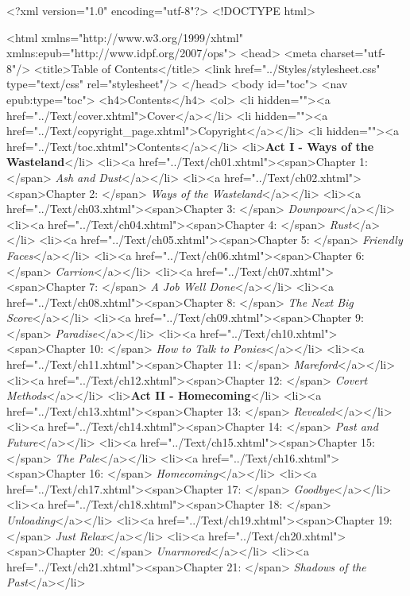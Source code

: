 <?xml version="1.0" encoding="utf-8"?>
<!DOCTYPE html>

<html xmlns="http://www.w3.org/1999/xhtml" xmlns:epub="http://www.idpf.org/2007/ops">
<head>
	<meta charset="utf-8"/>
	<title>Table of Contents</title>
	<link href="../Styles/stylesheet.css" type="text/css" rel="stylesheet"/>
</head>
<body id="toc">
<nav epub:type="toc">
	<h4>Contents</h4>
		<ol>
		<li hidden=""><a href="../Text/cover.xhtml">Cover</a></li>
		<li hidden=""><a href="../Text/copyright\_page.xhtml">Copyright</a></li>
		<li hidden=""><a href="../Text/toc.xhtml">Contents</a></li>
		<li>\textbf{Act I - Ways of the Wasteland}</li>
		<li><a href="../Text/ch01.xhtml"><span>Chapter 1: </span>\textit{ Ash and Dust}</a></li>
		<li><a href="../Text/ch02.xhtml"><span>Chapter 2: </span>\textit{ Ways of the Wasteland}</a></li>
		<li><a href="../Text/ch03.xhtml"><span>Chapter 3: </span>\textit{ Downpour}</a></li>
		<li><a href="../Text/ch04.xhtml"><span>Chapter 4: </span>\textit{ Rust}</a></li>
		<li><a href="../Text/ch05.xhtml"><span>Chapter 5: </span>\textit{ Friendly Faces}</a></li>
		<li><a href="../Text/ch06.xhtml"><span>Chapter 6: </span>\textit{ Carrion}</a></li>
		<li><a href="../Text/ch07.xhtml"><span>Chapter 7: </span>\textit{ A Job Well Done}</a></li>
		<li><a href="../Text/ch08.xhtml"><span>Chapter 8: </span>\textit{ The Next Big Score}</a></li>
		<li><a href="../Text/ch09.xhtml"><span>Chapter 9: </span>\textit{ Paradise}</a></li>
		<li><a href="../Text/ch10.xhtml"><span>Chapter 10: </span>\textit{ How to Talk to Ponies}</a></li>
		<li><a href="../Text/ch11.xhtml"><span>Chapter 11: </span>\textit{ Mareford}</a></li>
		<li><a href="../Text/ch12.xhtml"><span>Chapter 12: </span>\textit{ Covert Methods}</a></li>
				<li>\textbf{Act II - Homecoming}</li>
		<li><a href="../Text/ch13.xhtml"><span>Chapter 13: </span>\textit{ Revealed}</a></li>
		<li><a href="../Text/ch14.xhtml"><span>Chapter 14: </span>\textit{ Past and Future}</a></li>
		<li><a href="../Text/ch15.xhtml"><span>Chapter 15: </span>\textit{ The Pale}</a></li>
		<li><a href="../Text/ch16.xhtml"><span>Chapter 16: </span>\textit{ Homecoming}</a></li>
		<li><a href="../Text/ch17.xhtml"><span>Chapter 17: </span>\textit{ Goodbye}</a></li>
		<li><a href="../Text/ch18.xhtml"><span>Chapter 18: </span>\textit{ Unloading}</a></li>
		<li><a href="../Text/ch19.xhtml"><span>Chapter 19: </span>\textit{ Just Relax}</a></li>
		<li><a href="../Text/ch20.xhtml"><span>Chapter 20: </span>\textit{ Unarmored}</a></li>
		<li><a href="../Text/ch21.xhtml"><span>Chapter 21: </span>\textit{ Shadows of the Past}</a></li>
